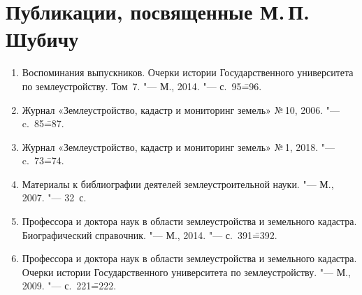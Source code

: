 \section{Публикации, посвященные М.\,П. Шубичу}
\begin{enumerate}[nosep]
	\item Воспоминания выпускников. Очерки истории Государственного университета по землеустройству. Том~7. "--- М., 2014. "--- с.~95\==96.
	\item Журнал «Землеустройство, кадастр и мониторинг земель» №\,10, 2006. "--- c.~85\==87.
	\item Журнал «Землеустройство, кадастр и мониторинг земель» №\,1, 2018. "--- c.~73\==74.
	\item Материалы к библиографии деятелей землеустроительной науки. "--- М., 2007. "--- 32~с.
	\item Профессора и доктора наук в области землеустройства и земельного кадастра. Биографический справочник. "--- М., 2014. "--- с.~391\==392.
	\item Профессора и доктора наук в области землеустройства и земельного кадастра. Очерки истории Государственного университета по землеустройству. "--- М., 2009. "--- с.~221\==222.
\end{enumerate}